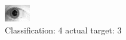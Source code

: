 \begin{figure}[h!]
\begin{center}
\includegraphics[width=0.60\columnwidth]{figures/ID1818_class_4_target_3.png}
\end{center}
\caption{ Classification: 4 actual target: 3}
\label{fig:ID1818_class_4_target_3}
\end{figure}
